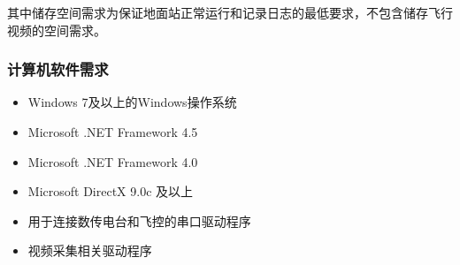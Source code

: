 其中储存空间需求为保证地面站正常运行和记录日志的最低要求，不包含储存飞行视频的空间需求。

\clearpage
\subsubsection{计算机软件需求}
\begin{itemize}[topsep=0pt]
\setlength{\itemsep}{-2pt}
\item Windows 7及以上的Windows操作系统
\item Microsoft .NET Framework 4.5
\item Microsoft .NET Framework 4.0
\item Microsoft DirectX 9.0c 及以上
\item 用于连接数传电台和飞控的串口驱动程序
\item 视频采集相关驱动程序
\end{itemize}

\endinput